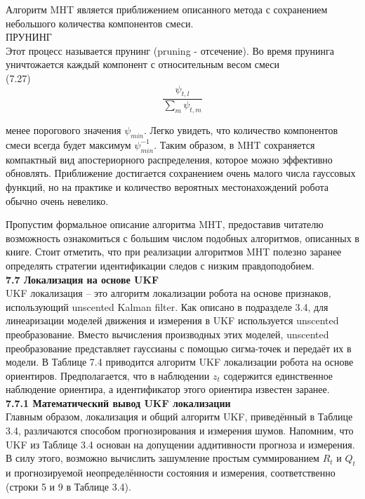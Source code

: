 \documentclass[10pt,a4paper]{article}
\begin{document}
Алгоритм MHT является приближением описанного метода с сохранением небольшого количества компонентов смеси.\\
ПРУНИНГ\\
Этот процесс называется прунинг (pruning - отсечение). Во время прунинга уничтожается каждый компонент с относительным весом смеси \\

(7.27)
$$\frac{\psi_{t,l}}{\sum_m \psi_{t,m}}$$

менее порогового значения $\psi_{min}$. Легко увидеть, что количество компонентов смеси всегда будет максимум $\psi_{min}^{-1}$. Таким образом, в MHT сохраняется компактный вид апостериорного распределения, которое можно эффективно обновлять. Приближение достигается сохранением очень малого числа гауссовых функций, но на практике и количество вероятных местонахождений робота обычно очень невелико. 

Пропустим формальное описание алгоритма MHT, предоставив читателю возможность ознакомиться с большим числом подобных алгоритмов, описанных в книге. 
Стоит отметить, что при реализации алгоритмов MHT полезно заранее определять стратегии идентификации следов с низким правдоподобием.\\

\textbf{7.7 Локализация на основе UKF }\\

UKF локализация – это алгоритм локализации робота на основе признаков, использующий unscented Kalman filter. Как описано в подразделе 3.4,  для линеаризации моделей движения и измерения в UKF используется unscented преобразование. Вместо вычисления производных этих моделей, unscented преобразование представляет гауссианы с помощью сигма-точек и передаёт их в модели. В Таблице 7.4 приводится алгоритм UKF локализации робота на основе ориентиров.
Предполагается, что в наблюдении $z_t$ содержится единственное наблюдение ориентира, а идентификатор этого ориентира известен заранее.\\

\textbf{7.7.1 Математический вывод UKF локализации}\\

Главным образом, локализация и общий алгоритм UKF, приведённый в Таблице 3.4, различаются способом прогнозирования и измерения шумов.
Напомним, что UKF из Таблице 3.4 основан на допущении аддитивности прогноза и измерения. В силу этого, возможно вычислить зашумление простым суммированием $R_t$ и $Q_t$ и прогнозируемой неопределённости состояния и измерения, соответственно (строки 5 и 9 в Таблице 3.4).\\
\end{document}
